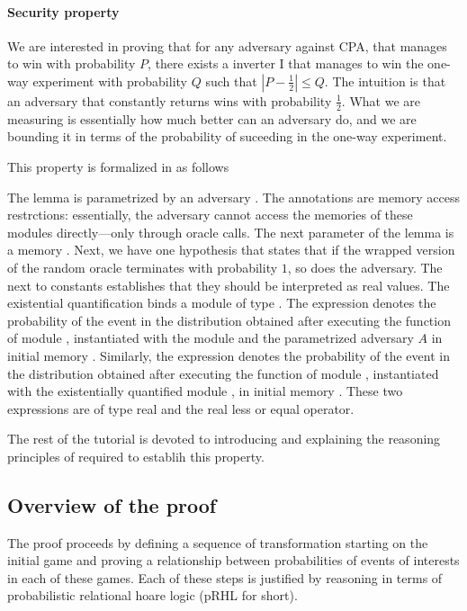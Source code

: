 \paragraph{Security property}
We are interested in proving that for any adversary  against CPA,
that manages to win with probability $P$, there exists a inverter
I that manages to win the one-way experiment with probability $Q$ such
that $| P - \frac{1}{2} |\leq Q$. The intuition is that an adversary
that constantly returns  wins with probability
$\frac{1}{2}$. What we are measuring is essentially how much better
can an adversary do, and we are bounding it in terms of the
probability of suceeding in the one-way experiment.

This property is formalized in \EC as follows


The lemma  is parametrized by an adversary . The
annotations  are memory access restrctions:
essentially, the adversary cannot access the memories of these modules
directly---only through oracle calls. The next parameter of the lemma
is a memory . Next, we have one hypothesis that states that if
the wrapped version of the random oracle terminates with probability
$1$, so does the adversary. The  next to constants establishes
that they should be interpreted as real values. The existential
quantification binds a module  of type . The
expression  denotes the
probability of the event  in the distribution obtained after
executing the  function of module , instantiated with
the module  and the parametrized adversary $A$ in initial
memory . Similarly, the expression  denotes the probability of the event  in the
distribution obtained after executing the  function of module
, instantiated with the existentially quantified module ,
in initial memory . These two expressions are of type real and
the \ec{<=} real less or equal operator.

The rest of the tutorial is devoted to introducing and explaining the
reasoning principles of \EC required to establih this property.

\subsection{Overview of the proof}
The proof proceeds by defining a sequence of transformation starting
on the initial game and proving a relationship between probabilities
of events of interests in each of these games. Each of these steps is
justified by reasoning in terms of probabilistic relational hoare
logic (pRHL for short).


